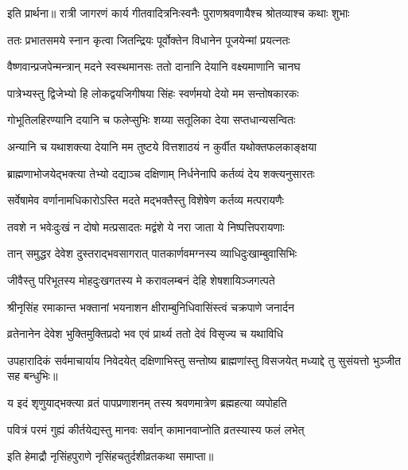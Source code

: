 इति प्रार्थना॥
\twolineshloka
{रात्री जागरणं कार्य गीतवादित्रनिःस्वनैः}
{पुराणश्रवणायैश्च श्रोतव्याश्च कथाः शुभाः} %

\twolineshloka
{ततः प्रभातसमये स्नान कृत्वा जितन्द्रियः}
{पूर्वोक्तेन विधानेन पूजयेन्मां प्रयत्नतः} %

\twolineshloka
{वैष्णवान्प्रजपेन्मन्त्रान् मदने स्वस्थमानसः}
{ततो दानानि देयानि वक्ष्यमाणानि चानघ} %

\twolineshloka
{पात्रेभ्यस्तु द्विजेभ्यो हि लोकद्वयजिगीषया}
{सिंहः स्वर्णमयो देयो मम सन्तोषकारकः} %

\twolineshloka
{गोभूतिलहिरण्यानि दयानि च फलेप्सुभिः}
{शय्या सतूलिका देया सप्तधान्यसन्वितः} %

\twolineshloka
{अन्यानि च यथाशक्त्या देयानि मम तुष्टये}
{वित्तशाठयं न कुर्वीत यथोक्तफलकाङ्क्षया} %

\twolineshloka
{ब्राह्मणाभोजयेद्भक्त्या तेभ्यो दद्याञ्च दक्षिणाम्}
{निर्धनेनापि कर्तव्यं देय शक्त्यनुसारतः} %


\twolineshloka
{सर्वेषामेव वर्णानामधिकारोऽस्ति मदते}
{मद्भक्तैस्तु विशेषेण कर्तव्य मत्परायणैः} %


\twolineshloka
{तवशे न भवेःदुःखं न दोषो मत्प्रसादतः}
{मद्वंशे ये नरा जाता ये निष्पत्तिपरायणाः} %


\twolineshloka
{तान् समुद्धर देवेश दुस्तराद्भवसागरात्}
{पातकार्णवमग्नस्य व्याधिदुःखाम्बुवासिभिः} %


\twolineshloka
{जीवैस्तु परिभूतस्य मोहदुःखगतस्य मे}
{करावलम्बनं देहि शेषशायिञ्जगत्पते} %


\twolineshloka
{श्रीनृसिंह रमाकान्त भक्तानां भयनाशन}
{क्षीराम्बुनिधिवासिंस्त्वं चक्रपाणे जनार्दन} %


\twolineshloka
{व्रतेनानेन देवेश भुक्तिमुक्तिप्रदो भव}
{एवं प्रार्थ्य ततो देवं विसृज्य च यथाविधि} %

\threelineshloka
{उपहारादिकं सर्वमाचार्याय निवेदयेत्}
{दक्षिणाभिस्तु सन्तोष्य ब्राह्मणांस्तु विसजयेत्} %
{मध्याद्दे तु सुसंयत्तो भुञ्जीत सह बन्धुभिः॥}

\twolineshloka
{य इदं शृणुयाद्भक्त्या व्रतं पापप्रणाशनम्}
{तस्य श्रवणमात्रेण ब्रह्महत्या व्यपोहति} %

\twolineshloka
{पवित्रं परमं गुह्यं कीर्तयेद्यस्तु मानवः}
{सर्वान् कामानवाप्नोति व्रतस्यास्य फलं लभेत्}

इति हेमाद्रौ नृसिंहपुराणे नृसिंहचतुर्दशीव्रतकथा समाप्ता॥


